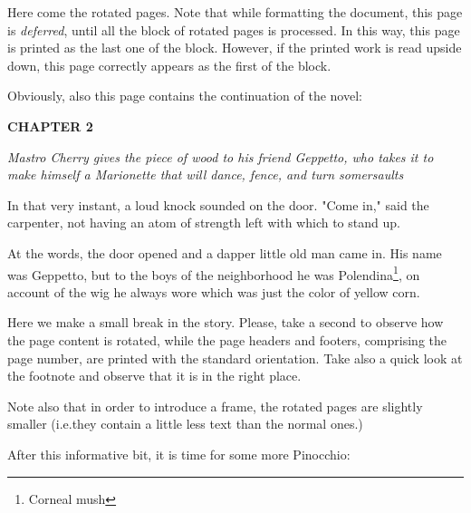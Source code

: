 \documentclass[12pt,twoside]{article}
\begin{document}
\rotboxpages%
Here come the rotated pages. Note that while formatting the
document, this page is \emph{deferred}, until all the block of rotated
pages is processed. In this way, this page is printed as the last one
of the block. However, if the printed work is read upside down, this
page correctly appears as the first of the block.

Obviously, also this page contains the continuation of the novel:

\bigskip
{\slshape%

  \textbf{CHAPTER 2}

  \emph{Mastro Cherry gives the piece of wood to his friend Geppetto,
    who takes it to make himself a Marionette that will dance,
    fence, and turn somersaults}
  \medskip
  
  In that very instant, a loud knock sounded on the door.
  "Come in," said the carpenter, not having an atom of
  strength left with which to stand up.
  
  At the words, the door opened and a dapper little old man came in.
  His name was Geppetto, but to the boys of the neighborhood he was
  Polendina\footnote{Corneal mush}, on account of the wig he always
  wore which was just the color of yellow corn.
  
}

\bigbreak

Here we make a small break in the story. Please, take a second to
observe how the page content is rotated, while the page headers and
footers, comprising the page number, are printed with the standard
orientation. Take also a quick look at the footnote and observe that
it is in the right place.

Note also that in order to introduce a frame, the rotated pages are
slightly smaller (i.e.\@ they contain a little less text than the
normal ones.)  

After this informative bit, it is time for some more Pinocchio:
\end{document}
